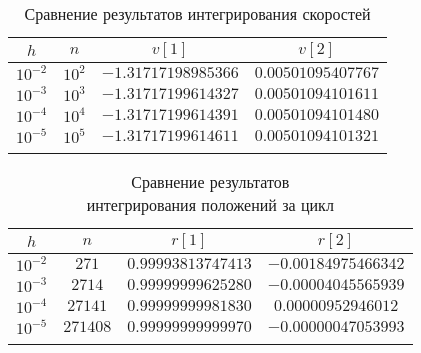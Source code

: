 \begin{frame}

\begin{table}[h]
  \centering
  \caption{Сравнение результатов интегрирования скоростей}
  \begin{tabular}{cccc}
    \toprule
    $ h $ &
    $ n $ &
    $ v[1] $ &
    $ v[2] $ \\
    \midrule
    $ 10^{-2} $ & $ 10^2 $ & $ -1.31717198985366 $ & $ 0.00501095407767 $ \\
    \arrayrulecolor{black!40}
    \midrule
    $ 10^{-3} $ & $ 10^3 $ & $ -1.31717199614327 $ & $ 0.00501094101611 $ \\
    \midrule
    $ 10^{-4} $ & $ 10^4 $ & $ -1.31717199614391 $ & $ 0.00501094101480 $ \\
    \midrule
    $ 10^{-5} $ & $ 10^5 $ & $ -1.31717199614611 $ & $ 0.00501094101321 $ \\
    \arrayrulecolor{black}
    \bottomrule
  \end{tabular}
\end{table}

\end{frame}

\begin{frame}

\begin{table}[h]
  \centering
  \caption{Сравнение результатов \\ интегрирования положений за цикл}
  \begin{tabular}{cccc}
    \toprule
    $ h $ &
    $ n $ &
    $ r[1] $ &
    $ r[2] $ \\
    \midrule
    $ 10^{-2} $ & $ 271 $ & $ 0.99993813747413 $ & $ -0.00184975466342 $ \\
    \arrayrulecolor{black!40}
    \midrule
    $ 10^{-3} $ & $ 2714 $ & $ 0.99999999625280 $ & $ -0.00004045565939 $ \\
    \midrule
    $ 10^{-4} $ & $ 27141 $ & $ 0.99999999981830 $ & $ 0.00000952946012 $ \\
    \midrule
    $ 10^{-5} $ & $ 271408 $ & $ 0.99999999999970 $ & $ -0.00000047053993 $ \\
    \arrayrulecolor{black}
    \bottomrule
  \end{tabular}
\end{table}

\end{frame}

